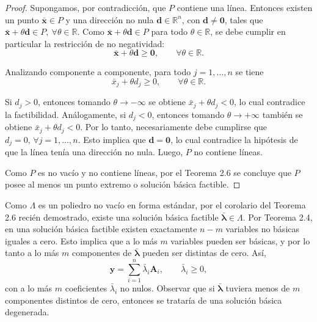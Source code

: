 \begin{enumerate}
\begin{proof}
Supongamos, por contradicción, que $P$ contiene una línea. Entonces existen un punto 
$\bar{\mathbf{x}} \in P$ y una dirección no nula $\mathbf{d} \in \mathbb{R}^n$, con $\mathbf{d} \neq \mathbf{0}$, tales que $    \bar{\mathbf{x}} + \theta \mathbf{d} \in P, \ \forall \theta \in \mathbb{R}.$ Como $\bar{\mathbf{x}} + \theta \mathbf{d} \in P$ para todo $\theta \in \mathbb{R}$, se debe cumplir en particular la restricción de no negatividad:
\begin{equation}
    \bar{\mathbf{x}} + \theta \mathbf{d} \geq \mathbf{0},
    \qquad \forall \theta \in \mathbb{R}.
\end{equation}

Analizando componente a componente, para todo $j = 1,\ldots,n$ se tiene
\begin{equation}
    \bar{x}_j + \theta d_j \geq 0,
    \qquad \forall \theta \in \mathbb{R}.
\end{equation}

Si $d_j > 0$, entonces tomando $\theta \to -\infty$ se obtiene 
$\bar{x}_j + \theta d_j < 0$, lo cual contradice la factibilidad. Análogamente, si 
$d_j < 0$, entonces tomando $\theta \to +\infty$ también se obtiene 
$\bar{x}_j + \theta d_j < 0$. Por lo tanto, necesariamente debe cumplirse que $d_j = 0, \, \forall j = 1,\ldots,n.$ Esto implica que $\mathbf{d} = \mathbf{0}$, lo cual contradice la hipótesis de que la línea tenía una dirección no nula. Luego, $P$ no contiene líneas.

Como $P$ es no vacío y no contiene líneas, por el Teorema 2.6 se concluye que $P$ posee al menos un punto extremo o solución básica factible. 
\end{proof}


Como $\Lambda$ es un poliedro no vacío en forma estándar, por el corolario del Teorema 2.6 recién demostrado, existe una solución básica factible $\bar{\boldsymbol{\lambda}} \in \Lambda$. Por Teorema 2.4, en una solución básica factible existen exactamente $n-m$ variables no básicas iguales a cero. Esto implica que a lo más $m$ variables pueden ser básicas, y por lo tanto a lo más $m$ componentes de $\bar{\boldsymbol{\lambda}}$ pueden ser distintas de cero. Así,
\begin{equation}
    \mathbf{y}
    =
    \sum_{i=1}^{n} \bar{\lambda}_i \mathbf{A}_i,
    \qquad
    \bar{\lambda}_i \geq 0,
\end{equation}
con a lo más $m$ coeficientes $\bar{\lambda}_i$ no nulos. Observar que si $\bar{\boldsymbol{\lambda}}$ tuviera menos de $m$ componentes distintos de cero, entonces se trataría de una solución básica degenerada.


\end{enumerate}
